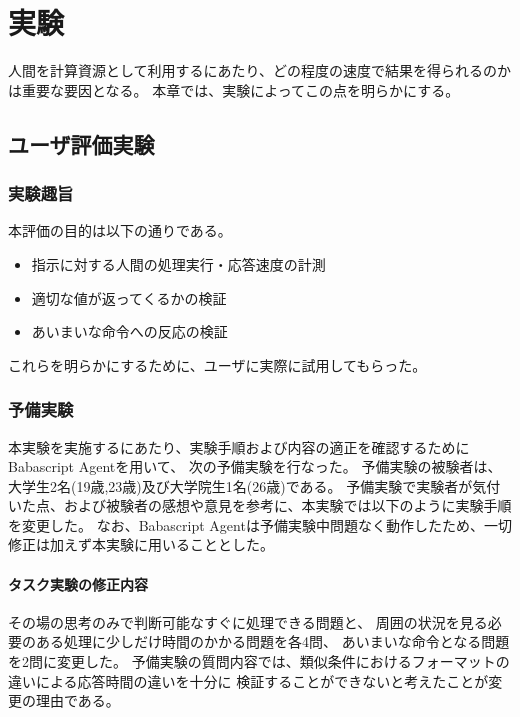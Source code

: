 \chapter{実験}\label{chap:evaluation}

人間を計算資源として利用するにあたり、どの程度の速度で結果を得られるのかは重要な要因となる。
本章では、実験によってこの点を明らかにする。

\section{ユーザ評価実験}\label{sec:user-evaluation}

\subsection{実験趣旨}\label{ux5b9fux9a13ux8da3ux65e8}

本評価の目的は以下の通りである。

\begin{itemize}
\itemsep1pt\parskip0pt
\item
  指示に対する人間の処理実行・応答速度の計測
\item
  適切な値が返ってくるかの検証
\item
  あいまいな命令への反応の検証
\end{itemize}

これらを明らかにするために、ユーザに実際に試用してもらった。

\subsection{予備実験}\label{ux4e88ux5099ux5b9fux9a13}

本実験を実施するにあたり、実験手順および内容の適正を確認するためにBabascript
Agentを用いて、 次の予備実験を行なった。
予備実験の被験者は、大学生2名(19歳,23歳)及び大学院生1名(26歳)である。
予備実験で実験者が気付いた点、および被験者の感想や意見を参考に、本実験では以下のように実験手順を変更した。
なお、Babascript
Agentは予備実験中問題なく動作したため、一切修正は加えず本実験に用いることとした。

\subsubsection{タスク実験の修正内容}\label{ux30bfux30b9ux30afux5b9fux9a13ux306eux4feeux6b63ux5185ux5bb9}

その場の思考のみで判断可能なすぐに処理できる問題と、
周囲の状況を見る必要のある処理に少しだけ時間のかかる問題を各4問、
あいまいな命令となる問題を2問に変更した。
予備実験の質問内容では、類似条件におけるフォーマットの違いによる応答時間の違いを十分に
検証することができないと考えたことが変更の理由である。

